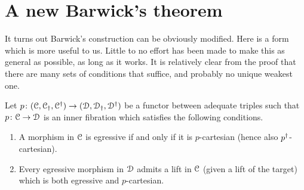 \documentclass[main.tex]{subfiles}
\begin{document}
\section{A new Barwick's theorem}
\label{sec:a_new_barwick_s_theorem}

It turns out Barwick's construction can be obviously modified. Here is a form which is more useful to us. Little to no effort has been made to make this as general as possible, as long as it works. It is relatively clear from the proof that there are many sets of conditions that suffice, and probably no unique weakest one.

\begin{theorem}
  \label{thm:new_barwick}
  Let $p\colon (\mathcal{C}, \mathcal{C}_{\dagger}, \mathcal{C}^{\dagger}) \to (\mathcal{D}, \mathcal{D}_{\dagger}, \mathcal{D}^{\dagger})$ be a functor between adequate triples such that $p\colon \mathcal{C} \to \mathcal{D}$ is an inner fibration which satisfies the following conditions.
  \begin{enumerate}
    \item A morphism in $\mathcal{C}$ is egressive if and only if it is $p$-cartesian (hence also $p^{\dagger}$-cartesian).

    \item Every egressive morphism in $\mathcal{D}$ admits a lift in $\mathcal{C}$ (given a lift of the target) which is both egressive and $p$-cartesian.


\end{enumerate}
\end{theorem}
\end{document}
